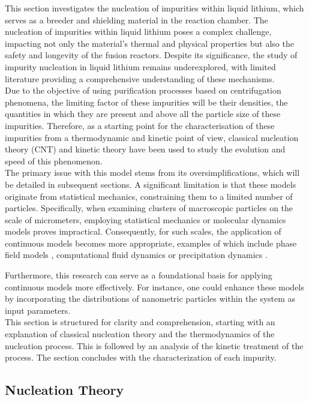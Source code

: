 This section investigates the nucleation of impurities within liquid lithium, which serves as a breeder and shielding material in the reaction chamber. The nucleation of impurities within liquid lithium poses a 
complex challenge, impacting not only the material's thermal and physical properties but also the safety and longevity of the fusion reactors. Despite its significance, 
the study of impurity nucleation in liquid lithium remains underexplored, with limited literature providing a comprehensive understanding of these mechanisms.
\\
Due to the objective of using purification processes based on centrifugation phenomena, the limiting factor of these impurities will be their densities, the quantities in which 
they are present and above all the particle size of these impurities. Therefore, as a starting point for the characterisation of these impurities from a thermodynamic and kinetic point of view, 
classical nucleation theory (CNT) and kinetic theory have been used to study the evolution and speed of this phenomenon.
\\
The primary issue with this model stems from its oversimplifications, which will be detailed in subsequent sections. A significant limitation is that these models originate from statistical mechanics, 
constraining them to a limited number of particles. Specifically, when examining clusters of macroscopic particles on the scale of micrometers, employing statistical mechanics or molecular dynamics models proves 
impractical. Consequently, for such scales, the application of continuous models becomes more appropriate, examples of which include phase field models \cite{Zhu2004,Garcia}, computational fluid dynamics or precipitation dynamics \cite{Sommitsch}.

Furthermore, this research can serve as a foundational basis for applying continuous models more effectively. For instance, one could enhance these models by incorporating the distributions of nanometric particles within the system as input parameters. 
\\
This section is structured for clarity and comprehension, starting with an explanation of classical nucleation theory and the thermodynamics of the nucleation process. This is followed by an analysis 
of the kinetic treatment of the process. 
The section concludes with the characterization of each impurity.

\subsection{Nucleation Theory}


